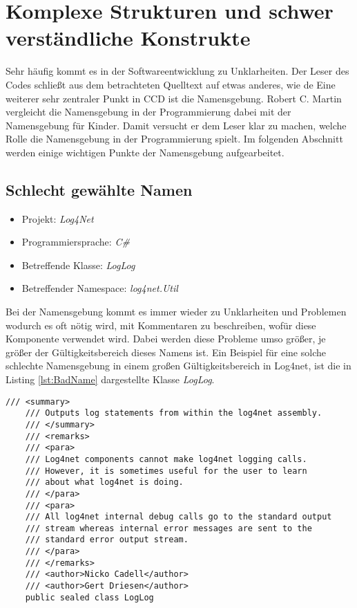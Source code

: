 \section{Komplexe Strukturen und schwer verständliche Konstrukte}

\SuperPar  Sehr häufig kommt es in der Softwareentwicklung zu Unklarheiten. Der Leser des Codes schließt aus dem betrachteten Quelltext auf etwas anderes, wie de
Eine weiterer sehr zentraler Punkt in CCD ist die Namensgebung. Robert C. Martin vergleicht die Namensgebung in der Programmierung dabei mit
der Namensgebung für Kinder. Damit versucht er dem Leser klar zu machen, welche Rolle die Namensgebung in der Programmierung spielt. Im
folgenden Abschnitt werden einige wichtigen Punkte der Namensgebung aufgearbeitet.

\subsection{Schlecht gewählte Namen}
\begin{itemize}
	\item Projekt: \textit{Log4Net}
	\item Programmiersprache: \textit{C\#}
	\item Betreffende Klasse: \textit{LogLog}
	\item Betreffender Namespace: \textit{log4net.Util}
\end{itemize}

\SuperPar Bei der Namensgebung kommt es immer wieder zu Unklarheiten und Problemen wodurch es oft nötig wird, mit Kommentaren zu beschreiben, wofür diese Komponente verwendet wird. Dabei werden diese Probleme umso größer, je größer der Gültigkeitsbereich dieses Namens ist. Ein Beispiel für eine solche schlechte Namensgebung in einem großen Gültigkeitsbereich in Log4net, ist die in Listing \ref{lst:BadName} dargestellte Klasse \textit{LogLog}. 

\begin{lstlisting}[language={[Sharp]C}, caption=Beispiele für schlechte Namensgebung, label=lst:BadName]
/// <summary>
	/// Outputs log statements from within the log4net assembly.
	/// </summary>
	/// <remarks>
	/// <para>
	/// Log4net components cannot make log4net logging calls.
	/// However, it is sometimes useful for the user to learn 
	/// about what log4net is doing.
	/// </para>
	/// <para>
	/// All log4net internal debug calls go to the standard output 
	/// stream whereas internal error messages are sent to the 
	/// standard error output stream.
	/// </para>
	/// </remarks>
	/// <author>Nicko Cadell</author>
	/// <author>Gert Driesen</author>
	public sealed class LogLog
\end{lstlisting}


